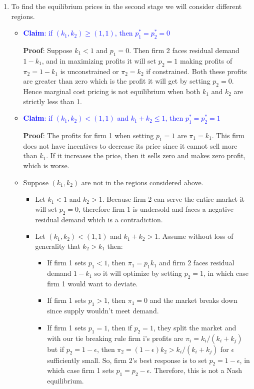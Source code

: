 \documentclass[11pt,english]{article}
\begin{document}
\begin{enumerate}
\item To find the equilibrium prices in the second stage we will consider different regions.
\begin{itemize}
\item \textcolor{blue}{\textbf{Claim}: if $(k_{1}, k_{2})\geq(1,1)$, then $p_{1}^{*}=p_{2}^{*}=0$}

\textbf{Proof}: Suppose $k_{1}<1$ and $p_{1}=0$. Then firm 2 faces residual demand $1-k_{1}$, and in maximizing profits it will set $p_{2}=1$ making profits of $\pi_{2}=1-k_{1}$ is unconstrained or $\pi_{2}=k_{2}$ if constrained. Both these profits are greater than zero which is the profit it will get by setting $p_{2}=0$. Hence marginal cost pricing is not equilibrium when both $k_{1}$ and $k_{2}$ are strictly less than 1.

\item \textcolor{blue}{\textbf{Claim}: if $(k_{1}, k_{2})<(1,1)$ and $k_{1}+k_{2}\leq1$, then $p_{1}^{*}=p_{2}^{*}=1$}

\textbf{Proof}: The profits for firm 1 when setting $p_{1}=1$ are $\pi_{1}=k_{1}$. This firm does not have incentives to decrease its price since it cannot sell more than $k_{1}$. If it increases the price, then it sells zero and makes zero profit, which is worse. 

\item Suppose $(k_{1},k_{2})$ are not in the regions considered above.
\begin{itemize}
\item Let $k_{1}<1$ and $k_{2}>1$. Because firm 2 can serve the entire market it will set $p_{2}=0$, therefore firm 1 is undersold and faces a negative residual demand which is a contradiction. 
\item Let $(k_{1}, k_{2})<(1,1)$ and $k_{1}+k_{2}>1$. Assume without loss of generality that $k_{2}>k_{1}$ then:
\begin{itemize}
\item If firm 1 sets $p_{1}<1$, then $\pi_{1}=p_{1}k_{1}$ and firm 2 faces residual demand $1-k_{1}$ so it will optimize by setting $p_{2}=1$, in which case firm 1 would want to deviate.
\item If firm 1 sets $p_{1}>1$, then $\pi_{1}=0$ and the market breaks down since supply wouldn't meet demand.
\item If firm 1 sets $p_{1}=1$, then if $p_{2}=1$, they split the market and with our tie breaking rule firm i's profits are $\pi_{i}=k_{i}/(k_{i}+k_{j})$ but if $p_{2}=1-\epsilon$, then $\pi_{2}=(1-\epsilon)k_{2}>k_{i}/(k_{i}+k_{j})$ for $\epsilon$ sufficiently small. So, firm 2's best response is to set $p_{2}=1-\epsilon$, in which case   firm 1 sets $p_{1}=p_{2}-\epsilon$. Therefore, this is not a Nash equilibrium.
\end{itemize}
\end{itemize}
\end{itemize}


\end{enumerate}
\end{document}
